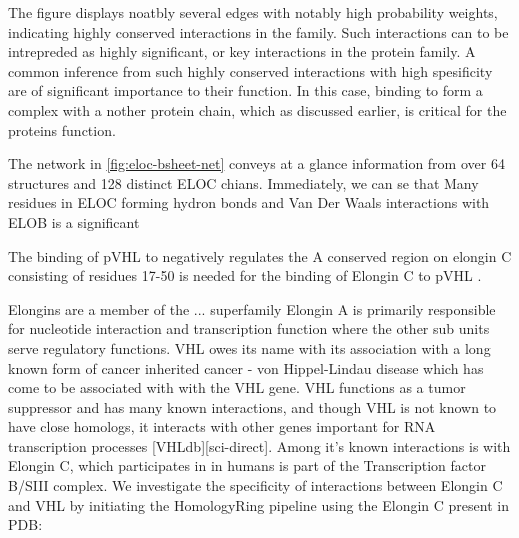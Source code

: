 The figure displays noatbly several edges with notably high probability weights, indicating highly conserved interactions in the family. Such interactions can to be intrepreded as highly significant, or key interactions in the protein family. A common inference from such highly conserved interactions with high spesificity are of significant importance to their function. In this case, binding to form a complex with a nother protein chain, which as discussed earlier, is critical for the proteins function.

The network in \ref{fig:eloc-bsheet-net} conveys at a glance information from over 64 structures and 128 distinct ELOC chians. Immediately, we can se that Many residues in ELOC forming hydron bonds and Van Der Waals interactions with ELOB is a significant 






The binding of pVHL to 
negatively regulates the 
A conserved region on elongin C consisting of residues 17-50 is needed for the binding of Elongin C to pVHL \cite{Ohh1999}.

Elongins are a member of the ... superfamily
Elongin A is primarily responsible for nucleotide interaction and transcription function where the other sub units serve regulatory functions.
VHL owes its name with its association with a long known form of cancer inherited cancer - von Hippel-Lindau disease which has come to be associated with with the VHL gene. 
VHL functions as a tumor suppressor and has many known interactions, and though  VHL is not known to have close homologs, it interacts with other genes important for RNA transcription processes [VHLdb][sci-direct]. 
Among it's known interactions is with Elongin C, which participates in in humans is part of the Transcription factor B/SIII complex.
We investigate the specificity of interactions between Elongin C and VHL by initiating the HomologyRing pipeline using the Elongin C present in PDB: 


